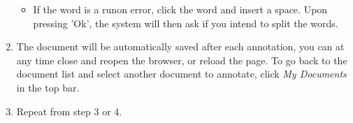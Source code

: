 \documentclass[a4paper,11pt]{article}
\begin{document}
\begin{enumerate}
\begin{itemize}
\begin{center}
  \end{center}
  \item If the word is a runon error, click the word and insert a space. Upon
    pressing 'Ok', the
    system will then ask if you intend to split the words.
\end{itemize}
\item The document will be automatically saved after each annotation, you can
  at any time close and reopen the browser, or reload the page. To go back to
  the document list and select another document to annotate, click \emph{My
  Documents} in the top bar.
\item Repeat from step 3 or 4.
\end{enumerate}


\end{document}
